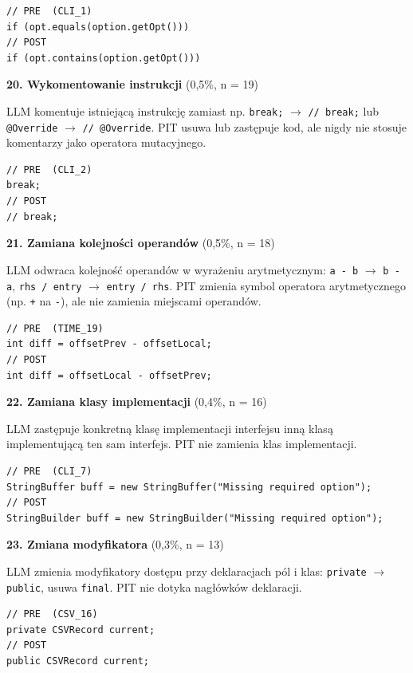 \documentclass[12pt,a4paper,oldfontcommands]{memoir}
\theoremstyle{plain}
\theoremstyle{definition}
\theoremstyle{remark}
\begin{document}
    \begin{lstlisting}
// PRE  (CLI_1)
if (opt.equals(option.getOpt()))
// POST
if (opt.contains(option.getOpt()))
    \end{lstlisting}

    \textbf{20. Wykomentowanie instrukcji} (0,5\%, n = 19)

    LLM komentuje istniejącą instrukcję zamiast np. \texttt{break;} $\rightarrow$ \texttt{// break;} lub \texttt{@Override} $\rightarrow$ \texttt{// @Override}.
    PIT usuwa lub zastępuje kod, ale nigdy nie stosuje komentarzy jako operatora mutacyjnego.

    \begin{lstlisting}
// PRE  (CLI_2)
break;
// POST
// break;
    \end{lstlisting}

    \textbf{21. Zamiana kolejności operandów} (0,5\%, n = 18)

    LLM odwraca kolejność operandów w wyrażeniu arytmetycznym: \texttt{a - b} $\rightarrow$ \texttt{b - a}, \texttt{rhs / entry} $\rightarrow$ \texttt{entry / rhs}.
    PIT zmienia symbol operatora arytmetycznego (np. \texttt{+} na \texttt{-}), ale nie zamienia miejscami operandów.

    \begin{lstlisting}
// PRE  (TIME_19)
int diff = offsetPrev - offsetLocal;
// POST
int diff = offsetLocal - offsetPrev;
    \end{lstlisting}

    \textbf{22. Zamiana klasy implementacji} (0,4\%, n = 16)

    LLM zastępuje konkretną klasę implementacji interfejsu inną klasą implementującą ten sam interfejs.
    PIT nie zamienia klas implementacji.

    \begin{lstlisting}
// PRE  (CLI_7)
StringBuffer buff = new StringBuffer("Missing required option");
// POST
StringBuilder buff = new StringBuilder("Missing required option");
    \end{lstlisting}

    \textbf{23. Zmiana modyfikatora} (0,3\%, n = 13)

    LLM zmienia modyfikatory dostępu przy deklaracjach pól i klas: \texttt{private} $\rightarrow$ \texttt{public}, usuwa \texttt{final}.
    PIT nie dotyka nagłówków deklaracji.

    \begin{lstlisting}
// PRE  (CSV_16)
private CSVRecord current;
// POST
public CSVRecord current;
    \end{lstlisting}
\end{document}
